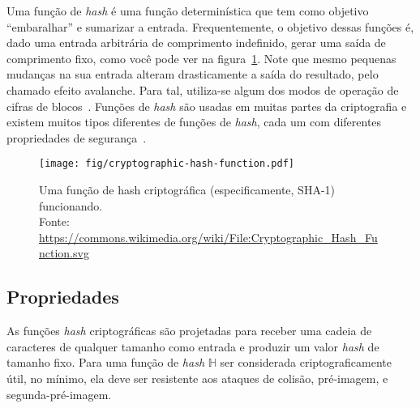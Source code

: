 Uma função de \textit{hash} é uma função determinística que tem como objetivo ``embaralhar'' e sumarizar a entrada.
Frequentemente, o objetivo dessas funções é, dado uma entrada arbitrária de comprimento indefinido, gerar uma saída de comprimento fixo, como você pode ver na figura~\ref{fig:função-hash}.
Note que mesmo pequenas mudanças na sua entrada alteram drasticamente a saída do resultado, pelo chamado efeito avalanche.
Para tal, utiliza-se algum dos modos de operação de cifras de blocos~\cite{wiki:cifras}.
Funções de \textit{hash} são usadas em muitas partes da criptografia e existem muitos tipos diferentes de funções de \textit{hash}, cada um com diferentes propriedades de segurança~\cite{HASH1}.

\begin{figure}[htb!]
    \centering
    \texttt{[image: fig/cryptographic-hash-function.pdf]}
    \caption[Cryptographic hash function input and output examples]{
        Uma função de hash criptográfica (especificamente, SHA-1) funcionando.\\
        Fonte: \url{https://commons.wikimedia.org/wiki/File:Cryptographic_Hash_Function.svg}
    }
    \label{fig:função-hash}
\end{figure}

\subsection{Propriedades}

As funções \textit{hash} criptográficas são projetadas para receber uma cadeia de caracteres de qualquer tamanho como entrada e produzir um valor \textit{hash} de tamanho fixo.
Para uma função de \textit{hash} $\mathbb{H}$ ser considerada criptograficamente útil, no mínimo, ela deve ser resistente aos ataques de colisão, pré-imagem, e segunda-pré-imagem.


